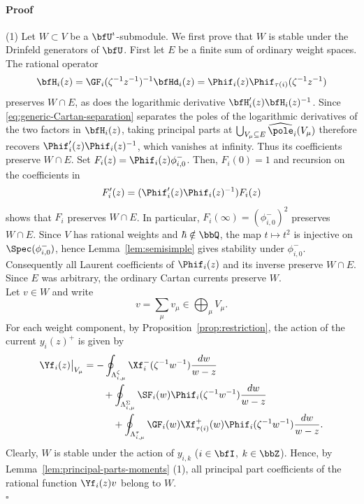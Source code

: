 \documentclass[reqno]{amsart}
\numberwithin{equation}{section}
\newenvironment{pf}{\medskip\paragraph{{\sc Proof}}}{\hfill$\square$\par\medskip}
\begin{document}
\begin{pf}
(1)
Let $W\subset V$ be a $\bfU^\imath$-submodule. We first prove that $W$
is stable under the Drinfeld generators of $\bfU$.
First let $E$ be a finite sum of ordinary weight spaces. The rational operator
\[
\bfH_i(z)=\GF_i(\zeta^{-1}z^{-1})^{-1}\bfHd_i(z)
=\Phif_i(z)\Phif_{\tau(i)}(\zeta^{-1}z^{-1})
\]
preserves $W\cap E$, as does the logarithmic derivative $\bfH_i'(z)\bfH_i(z)^{-1}$. Since \eqref{eq:generic-Cartan-separation} separates the poles of the
logarithmic derivatives of the two factors in $\bfH_i(z)$, taking principal parts
at $\bigcup_{V_\mu\subseteq E}\widehat{\pole}_i(V_\mu)$ therefore
recovers $\Phif_i'(z)\Phif_i(z)^{-1}$, which vanishes at
infinity. Thus its coefficients preserve $W\cap E$.
Set $F_i(z)=\Phif_i(z)\phi_{i,0}^-$. Then, $F_i(0)=1$ and recursion on the coefficients in
\[
F_i'(z)=(\Phif_i'(z)\Phif_i(z)^{-1})F_i(z)
\]
shows that $F_i$  preserves $W\cap E$.
In particular, $F_i(\infty)=(\phi_{i,0}^{-})^{2}$ preserves $W\cap E$.
Since $V$ has rational weights and $\hbar\notin\bbQ$, the map
$t\mapsto t^{2}$ is injective on $\Spec(\phi^-_{i,0})$, hence
Lemma~\ref{lem:semisimple} gives stability under $\phi^-_{i,0}$.
Consequently all Laurent coefficients of $\Phif_i(z)$ and its
inverse preserve $W\cap E$. Since $E$ was arbitrary, the ordinary
Cartan currents preserve $W$.\\

Let $v\in W$ and write
\[
v=\sum_\mu v_\mu\in\bigoplus_\mu V_\mu.
\]
	For each weight component, by Proposition~\ref{prop:restriction}, the action of the current $y_i(z)^+$ is given by
\begin{equation}\label{eq:Y-action-three-pieces-generic}
	\begin{aligned}
	\Yf_i(z)\big|_{V_\mu}
	&=
	-\oint_{\Lambda^\zeta_{i,\mu}}
	\Xf_i^-(\zeta^{-1}w^{-1})
	\frac{dw}{w-z}
	\\
	&\quad\quad+
	\oint_{\Lambda^\Sigma_{i,\mu}}
	\SF_i(w)\Phif_i(\zeta^{-1}w^{-1})
	\frac{dw}{w-z}
	\nonumber\\
	&\quad\quad\quad+
	\oint_{\Lambda^\tau_{i,\mu}}
	\GF_i(w)\Xf_{\tau(i)}^+(w)\Phif_i(\zeta^{-1}w^{-1})
	\frac{dw}{w-z}.
	\end{aligned}
\end{equation}
Clearly, $W$ is stable under the action of $y_{i,k}$ ($i\in\bfI$, $k\in\bbZ$).
Hence, by Lemma~\ref{lem:principal-parts-moments} (1), all principal part
coefficients of the rational function $\Yf_i(z)v$ belong to $W$.\\


\end{pf}
\end{document}
